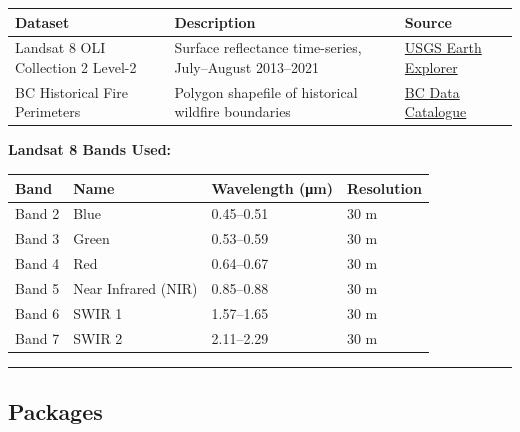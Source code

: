 \documentclass[
]{article}
\begin{document}
\begin{longtable}[]{@{}
  >{\raggedright\arraybackslash}p{}
  >{\raggedright\arraybackslash}p{}
  >{\raggedright\arraybackslash}p{}@{}}
\toprule\noalign{}
\begin{minipage}[b]{\linewidth}\raggedright
Dataset
\end{minipage} & \begin{minipage}[b]{\linewidth}\raggedright
Description
\end{minipage} & \begin{minipage}[b]{\linewidth}\raggedright
Source
\end{minipage} \\
\midrule\noalign{}
\endhead
\bottomrule\noalign{}
\endlastfoot
Landsat 8 OLI Collection 2 Level-2 & Surface reflectance time-series,
July--August 2013--2021 & \href{https://earthexplorer.usgs.gov/}{USGS
Earth Explorer} \\
BC Historical Fire Perimeters & Polygon shapefile of historical wildfire
boundaries &
\href{https://catalogue.data.gov.bc.ca/dataset/fire-perimeters-historical}{BC
Data Catalogue} \\
\end{longtable}

\textbf{Landsat 8 Bands Used:}

\begin{longtable}[]{@{}llll@{}}
\toprule\noalign{}
Band & Name & Wavelength (μm) & Resolution \\
\midrule\noalign{}
\endhead
\bottomrule\noalign{}
\endlastfoot
Band 2 & Blue & 0.45--0.51 & 30 m \\
Band 3 & Green & 0.53--0.59 & 30 m \\
Band 4 & Red & 0.64--0.67 & 30 m \\
Band 5 & Near Infrared (NIR) & 0.85--0.88 & 30 m \\
Band 6 & SWIR 1 & 1.57--1.65 & 30 m \\
Band 7 & SWIR 2 & 2.11--2.29 & 30 m \\
\end{longtable}

\begin{center}\rule{0.5\linewidth}{0.5pt}\end{center}

\subsection{Packages}\label{packages}
\end{document}
